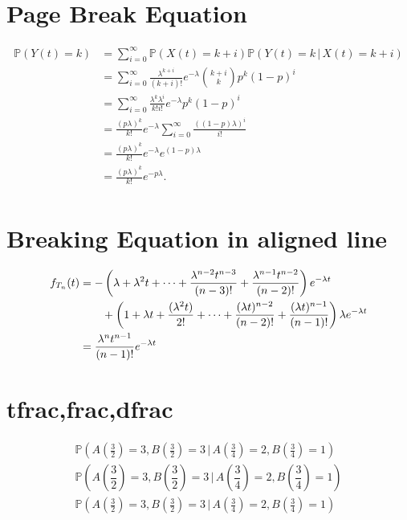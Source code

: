 \documentclass[11pt,a4paper]{article}
\begin{document}
    \section*{Page Break Equation}
    \begingroup
    \allowdisplaybreaks
    \begin{align*}
        \mathbb{P}(Y(t) = k)
        &= \sum_{i=0}^\infty \mathbb{P}(X(t) = k+i)\mathbb{P}(Y(t) = k\, | \, X(t)=k+i)\\
        &= \sum_{i=0}^\infty \frac{\lambda^{k+i}}{(k+i)!}e^{-\lambda}\binom{k+i}{k}p^k(1-p)^i\\
        &= \sum_{i=0}^\infty \frac{\lambda^k \lambda^i}{k!i!}e^{-\lambda}p^k(1-p)^i\\
        &= \frac{(p\lambda)^k}{k!}e^{-\lambda} \sum_{i=0}^\infty \frac{((1-p)\lambda)^i}{i!}\\
        &= \frac{(p\lambda)^k}{k!}e^{-\lambda}e^{(1-p)\lambda}\\
        &= \frac{(p\lambda)^k}{k!}e^{-p\lambda}.\\
    \end{align*}
    \endgroup
    \section*{Breaking Equation in aligned line}
    \begin{align*}
        f_{T_n}(t)
        &= -\left(\lambda + \lambda^2t+\cdots+\frac{\lambda^{n-2}t^{n-3}}{(n-3)!}+\frac{\lambda^{n-1}t^{n-2}}{(n-2)!}\right)e^{-\lambda t}\notag \\
        & \quad \quad + \left(1 + \lambda t + \frac{(\lambda^2t)}{2!}+\cdots+\frac{(\lambda t)^{n-2}}{(n-2)!}+\frac{(\lambda t)^{n-1}}{(n-1)!}\right)\lambda e^{-\lambda t}\\
        &= \frac{\lambda^nt^{n-1}}{(n-1)!}e^{-\lambda t}
    \end{align*}
    \section*{tfrac,frac,dfrac}
    \begin{align*}
        \mathbb{P}(A(\tfrac{3}{2})= 3, B(\tfrac{3}{2}) = 3\, | \, A(\tfrac{3}{4}) = 2, B(\tfrac{3}{4})=1)\\
        \mathbb{P}(A(\dfrac{3}{2})= 3, B(\dfrac{3}{2}) = 3\, | \, A(\dfrac{3}{4}) = 2, B(\dfrac{3}{4})=1)\\
        \mathbb{P}(A(\frac{3}{2})= 3, B(\frac{3}{2}) = 3\, | \, A(\frac{3}{4}) = 2, B(\frac{3}{4})=1)
    \end{align*}
\end{document}

